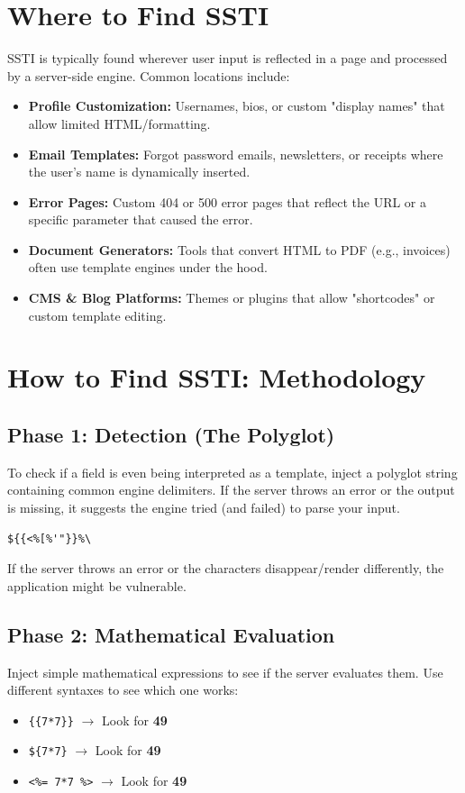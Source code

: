 \documentclass{article}
\begin{document}
\section{Where to Find SSTI}
SSTI is typically found wherever user input is reflected in a page and processed by a server-side engine. Common locations include:

\begin{itemize}
    \item \textbf{Profile Customization:} Usernames, bios, or custom "display names" that allow limited HTML/formatting.
    \item \textbf{Email Templates:} Forgot password emails, newsletters, or receipts where the user's name is dynamically inserted.
    \item \textbf{Error Pages:} Custom 404 or 500 error pages that reflect the URL or a specific parameter that caused the error.
    \item \textbf{Document Generators:} Tools that convert HTML to PDF (e.g., invoices) often use template engines under the hood.
    \item \textbf{CMS \& Blog Platforms:} Themes or plugins that allow "shortcodes" or custom template editing.
\end{itemize}

\section{How to Find SSTI: Methodology}

\subsection{Phase 1: Detection (The Polyglot)}
To check if a field is even being interpreted as a template, inject a polyglot string containing common engine delimiters. If the server throws an error or the output is missing, it suggests the engine tried (and failed) to parse your input.

\begin{lstlisting}[caption=Universal Detection Polyglot]
${{<%[%'"}}%\
\end{lstlisting}

If the server throws an error or the characters disappear/render differently, the application might be vulnerable.

\subsection{Phase 2: Mathematical Evaluation}
Inject simple mathematical expressions to see if the server evaluates them. Use different syntaxes to see which one works:
\begin{itemize}
    \item \texttt{\{\{7*7\}\}} $\rightarrow$ Look for \textbf{49}
    \item \texttt{\$\{7*7\}} $\rightarrow$ Look for \textbf{49}
    \item \texttt{<\%= 7*7 \%>} $\rightarrow$ Look for \textbf{49}
\end{itemize}
\end{document}
